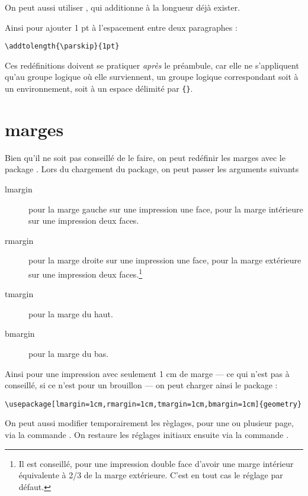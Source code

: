 On peut aussi utiliser , qui additionne  à la longueur déjà exister.

Ainsi pour ajouter 1 pt à l'espacement entre deux paragraphes :

\begin{verbatim}
\addtolength{\parskip}{1pt}
\end{verbatim}

Ces redéfinitions doivent se pratiquer \emph{après} le préambule, car elle ne s'appliquent qu'au groupe logique où elle surviennent, un groupe logique correspondant soit à un environnement, soit à un espace délimité par \verb|{}|.

\section{marges}

Bien qu'il ne soit pas conseillé de le faire, on peut redéfinir les marges avec le package . Lors du chargement du package, on peut passer les arguments suivants
\begin{description}
\item[lmargin]pour la marge gauche sur une impression une face, pour la marge intérieure sur une impression deux faces.
\item[rmargin]pour la marge droite sur une impression une face, pour la marge extérieure sur une impression deux faces.\footnote{Il est conseillé, pour une impression double face d'avoir une marge intérieur équivalente à 2/3 de la marge extérieure. C'est en tout cas le réglage par défaut.}
\item[tmargin]pour la marge du haut.
\item[bmargin]pour la marge du bas.
\end{description}

Ainsi pour une impression avec seulement 1 cm de marge --- ce qui n'est pas à conseillé, si ce n'est pour un brouillon --- on peut charger ainsi le package :

\begin{verbatim}
\usepackage[lmargin=1cm,rmargin=1cm,tmargin=1cm,bmargin=1cm]{geometry}
\end{verbatim}

On peut aussi modifier temporairement les règlages, pour une ou plusieur page, via la commande . On restaure les réglages initiaux ensuite via la commande .

